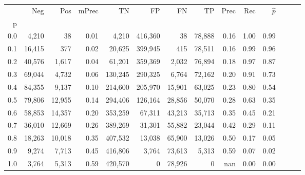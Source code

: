 \begin{tabular}{rrrrrrrrrrrrrr}
\toprule
{} &     Neg &     Pos & mPrec &       TN &       FP &      FN &      TP &  Prec &   Rec & $\hat{p}$ \\
p   &         &         &       &          &          &         &         &       &       &           \\
\midrule
0.0 &   4,210 &      38 &  0.01 &    4,210 &  416,360 &      38 &  78,888 &  0.16 &  1.00 &      0.99 \\
0.1 &  16,415 &     377 &  0.02 &   20,625 &  399,945 &     415 &  78,511 &  0.16 &  0.99 &      0.96 \\
0.2 &  40,576 &   1,617 &  0.04 &   61,201 &  359,369 &   2,032 &  76,894 &  0.18 &  0.97 &      0.87 \\
0.3 &  69,044 &   4,732 &  0.06 &  130,245 &  290,325 &   6,764 &  72,162 &  0.20 &  0.91 &      0.73 \\
0.4 &  84,355 &   9,137 &  0.10 &  214,600 &  205,970 &  15,901 &  63,025 &  0.23 &  0.80 &      0.54 \\
0.5 &  79,806 &  12,955 &  0.14 &  294,406 &  126,164 &  28,856 &  50,070 &  0.28 &  0.63 &      0.35 \\
0.6 &  58,853 &  14,357 &  0.20 &  353,259 &   67,311 &  43,213 &  35,713 &  0.35 &  0.45 &      0.21 \\
0.7 &  36,010 &  12,669 &  0.26 &  389,269 &   31,301 &  55,882 &  23,044 &  0.42 &  0.29 &      0.11 \\
0.8 &  18,263 &  10,018 &  0.35 &  407,532 &   13,038 &  65,900 &  13,026 &  0.50 &  0.17 &      0.05 \\
0.9 &   9,274 &   7,713 &  0.45 &  416,806 &    3,764 &  73,613 &   5,313 &  0.59 &  0.07 &      0.02 \\
1.0 &   3,764 &   5,313 &  0.59 &  420,570 &        0 &  78,926 &       0 &   nan &  0.00 &      0.00 \\
\bottomrule
\end{tabular}
